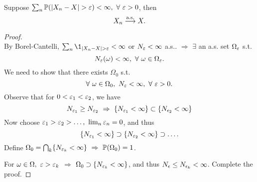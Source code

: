 \vspace{3pt}
\begin{corollary} \label{BCL1}\ \\
Suppose $\sum_n \mathbb{P}(\abs{X_n - X} > \varepsilon) < \infty,\ \forall\ \varepsilon > 0$, then
\begin{equation*}
    X_n \overset{\text{a.s.}}{\longrightarrow} X.
\end{equation*}
\end{corollary}
\begin{proof}\ \\
By Borel-Cantelli, $\sum_n \1_{\abs{X_n - X} > \vep} < \infty$ or $N_\varepsilon < \infty$ a.s.. $\Rightarrow$ $\exists$ an a.s. set $\Omega_\varepsilon$ s.t. 
\begin{equation*}
    N_\varepsilon (\omega) < \infty,\ \forall\ \omega \in \Omega_\varepsilon.
\end{equation*}
We need to show that there exists $\Omega_0$ s.t.
\begin{equation*}
    \forall\ \omega \in \Omega_0,\ N_\varepsilon < \infty,\ \forall\ \varepsilon > 0.
\end{equation*}
Observe that for $0 < \varepsilon_1 < \varepsilon_2$, we have 
\begin{equation*}
    N_{\vep_1} \geq N_{\vep_2}\ \Rightarrow\ \{N_{\vep_1} < \infty\} \subset \{N_{\ep_2} < \infty\}
\end{equation*}
Now choose $\vep_1 > \vep_2 > \dots,\ \lim_n \vep_n = 0$, and thus
\begin{equation*}
    \{N_{\varepsilon_1} < \infty\} \supset \{N_{\varepsilon_2} < \infty\} \supset \dots.
\end{equation*}
Define $\Omega_0 = \cap_{k} \{N_{\vep_k} < \infty\}\ \Rightarrow\ \P(\Omega_0) = 1$.

\np For $\omega \in \Omega,\ \varepsilon > \varepsilon_k$ $\Rightarrow$ $\Omega_0 \supset \{N_{\varepsilon_k} < \infty\}$, and thus $N_\epsilon \leq N_{\epsilon_k} < \infty$. Complete the proof.
\end{proof}


